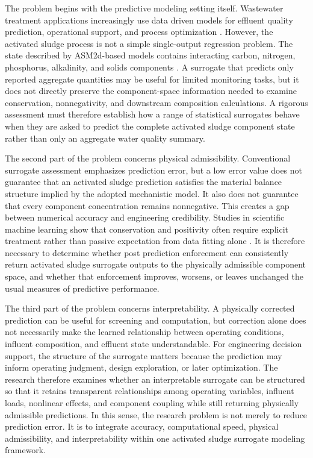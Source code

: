 \documentclass[12pt, twoside]{book}
\begin{document}
The problem begins with the predictive modeling setting itself. Wastewater treatment applications increasingly
use data driven models for effluent quality prediction, operational support, and process optimization
\citep{Newhart2019,Mao2024,Wang2025,Yang2025}. However, the activated sludge process is not a simple
single-output regression problem. The state described by ASM2d-based models contains interacting carbon,
nitrogen, phosphorus, alkalinity, and solids components \citep{Henze1999,Henze2006,Guerrero2011}. A surrogate
that predicts only reported aggregate quantities may be useful for limited monitoring tasks, but it does not
directly preserve the component-space information needed to examine conservation, nonnegativity, and
downstream composition calculations. A rigorous assessment must therefore establish how a range of statistical
surrogates behave when they are asked to predict the complete activated sludge component state rather than only
an aggregate water quality summary.

The second part of the problem concerns physical admissibility. Conventional surrogate assessment emphasizes
prediction error, but a low error value does not guarantee that an activated sludge prediction satisfies the
material balance structure implied by the adopted mechanistic model. It also does not guarantee that every
component concentration remains nonnegative. This creates a gap between numerical accuracy and engineering
credibility. Studies in scientific machine learning show that conservation and positivity often require
explicit treatment rather than passive expectation from data fitting alone
\citep{Beucler2021,Hansen2024,KircherVotsmeier2025,SturmWexler2020,SturmWexler2022}. It is therefore
necessary to determine whether post prediction enforcement can consistently return activated sludge surrogate
outputs to the physically admissible component space, and whether that enforcement improves, worsens, or leaves
unchanged the usual measures of predictive performance.

The third part of the problem concerns interpretability. A physically corrected prediction can be useful for
screening and computation, but correction alone does not necessarily make the learned relationship between
operating conditions, influent composition, and effluent state understandable. For engineering decision support,
the structure of the surrogate matters because the prediction may inform operating judgment, design
exploration, or later optimization. The research therefore examines whether an interpretable surrogate can be
structured so that it retains transparent relationships among operating variables, influent loads, nonlinear
effects, and component coupling while still returning physically admissible predictions. In this sense, the
research problem is not merely to reduce prediction error. It is to integrate accuracy, computational speed,
physical admissibility, and interpretability within one activated sludge surrogate modeling framework.
\end{document}
